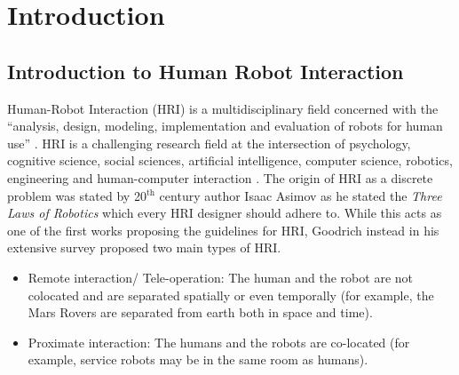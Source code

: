 
\chapter{Introduction} %

\label{Chapter1} %



\section{Introduction to Human Robot Interaction}
	Human-Robot Interaction (HRI) is a multidisciplinary field concerned with the ``analysis, design, modeling, implementation and evaluation of robots for human use'' \cite{fong2003collaboration}. HRI is a challenging research field at the intersection of psychology, cognitive science, social sciences, artificial intelligence, computer science, robotics, engineering and human-computer interaction \cite{dautenhahn2007methodology}. The origin of HRI as a discrete problem was stated by 20$^{\text{th}}$ century author Isaac Asimov \cite{IssacAsimov} as he stated the \emph{Three Laws of Robotics} which every HRI designer should adhere to. While this acts as one of the first works proposing the guidelines for HRI, Goodrich \cite{goodrich2007human} instead in his extensive survey proposed two main types of HRI.
\begin{itemize}
\item Remote interaction/ Tele-operation: The human and the robot are not colocated and are separated spatially or even temporally (for example, the Mars Rovers are separated from earth both in space and time). 
\item Proximate interaction: The humans and the robots are co-located (for example, service robots may be in the same room as humans).
\end{itemize}
